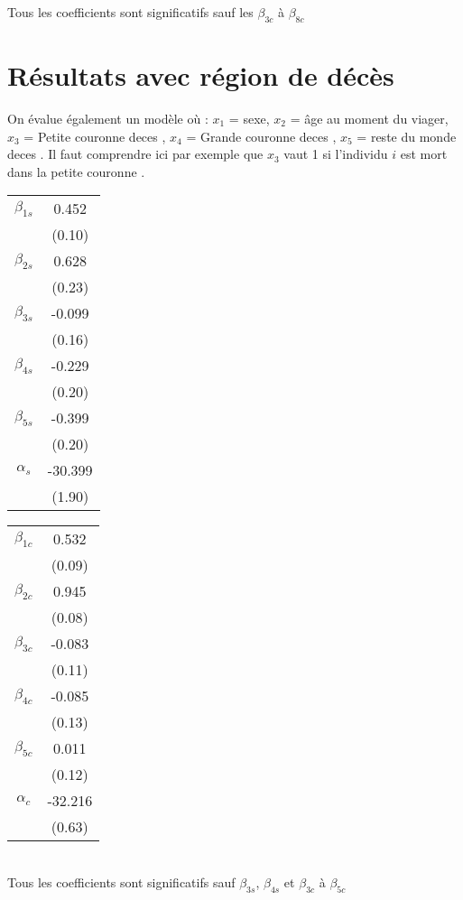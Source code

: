 \documentclass{article}
\begin{document}
Tous les coefficients sont significatifs sauf les $\beta_{3c}$ à $\beta_{8c}$

\section{Résultats avec région de décès}

On évalue également un modèle où : $x_{1}$ = sexe, $x_{2}$ = âge au moment du viager, $x_{3}$ = Petite couronne deces , $x_{4}$ = Grande couronne deces , $x_{5}$ = reste du monde deces .
Il faut comprendre ici par exemple que $x_{3}$ vaut 1 si l'individu $i$ est mort dans la petite couronne .\\


\begin{tabular}{c|c||}


            
$\beta_{1s}$ & 0.452   \\
            &(0.10)    \\
$\beta_{2s} $& 0.628  \\
            &(0.23)  \\
$\beta_{3s} $& -0.099  \\
            &(0.16)  \\
$\beta_{4s} $& -0.229  \\
            &(0.20)  \\
$\beta_{5s} $& -0.399  \\
            &(0.20)  \\
$\alpha_s $& -30.399  \\
        &(1.90)    \\
        \end{tabular}
        \begin{tabular}{c|c|}
$\beta_{1c}$ & 0.532 \\
            &(0.09)  \\
$\beta_{2c}$ & 0.945  \\
            &(0.08) \\
$\beta_{3c}$ & -0.083 \\
            &(0.11)  \\
$\beta_{4c}$ & -0.085  \\
            &(0.13) \\
$\beta_{5c}$ & 0.011 \\
            &(0.12)  \\
$\alpha_c$ & -32.216 \\
        &(0.63)  \\
\end{tabular}\\

Tous les coefficients sont significatifs sauf $\beta_{3s}$, $\beta_{4s}$ et $\beta_{3c}$ à $\beta_{5c}$
\end{document}

